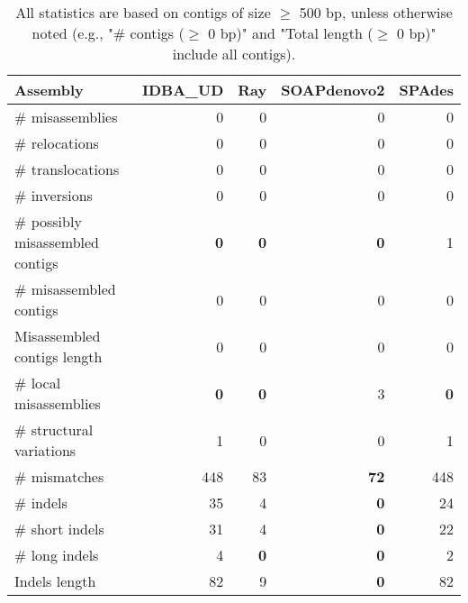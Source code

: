 \documentclass[12pt,a4paper]{article}
\begin{document}
\begin{table}[ht]
\begin{center}
\caption{All statistics are based on contigs of size $\geq$ 500 bp, unless otherwise noted (e.g., "\# contigs ($\geq$ 0 bp)" and "Total length ($\geq$ 0 bp)" include all contigs).}
\begin{tabular}{|l*{4}{|r}|}
\hline
Assembly & IDBA\_UD & Ray & SOAPdenovo2 & SPAdes \\ \hline
\# misassemblies & 0 & 0 & 0 & 0 \\ \hline
\hspace{5mm}\# relocations & 0 & 0 & 0 & 0 \\ \hline
\hspace{5mm}\# translocations & 0 & 0 & 0 & 0 \\ \hline
\hspace{5mm}\# inversions & 0 & 0 & 0 & 0 \\ \hline
\# possibly misassembled contigs & {\bf 0} & {\bf 0} & {\bf 0} & 1 \\ \hline
\# misassembled contigs & 0 & 0 & 0 & 0 \\ \hline
Misassembled contigs length & 0 & 0 & 0 & 0 \\ \hline
\# local misassemblies & {\bf 0} & {\bf 0} & 3 & {\bf 0} \\ \hline
\# structural variations & 1 & 0 & 0 & 1 \\ \hline
\# mismatches & 448 & 83 & {\bf 72} & 448 \\ \hline
\# indels & 35 & 4 & {\bf 0} & 24 \\ \hline
\hspace{5mm}\# short indels & 31 & 4 & {\bf 0} & 22 \\ \hline
\hspace{5mm}\# long indels & 4 & {\bf 0} & {\bf 0} & 2 \\ \hline
Indels length & 82 & 9 & {\bf 0} & 82 \\ \hline
\end{tabular}
\end{center}
\end{table}
\end{document}
